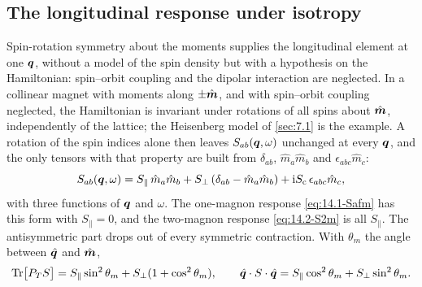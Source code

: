 \subsection{The longitudinal response under isotropy}\label{sec:14.4-iso}

Spin-rotation symmetry about the moments supplies the longitudinal element at one $\bm{q}$, without a model of the spin density but with a hypothesis on the Hamiltonian: spin--orbit coupling and the dipolar interaction are neglected. In a collinear magnet with moments along $\pm\hat{\bm{m}}$, and with spin--orbit coupling neglected, the Hamiltonian is invariant under rotations of all spins about $\hat{\bm{m}}$, independently of the lattice; the Heisenberg model of \cref{sec:7.1} is the example. A rotation of the spin indices alone then leaves $S_{ab}(\bm{q},\omega)$ unchanged at every $\bm{q}$, and the only tensors with that property are built from $\delta_{ab}$, $\hat m_a\hat m_b$ and $\epsilon_{abc}\hat m_c$:
\begin{equation*}
  S_{ab}(\bm{q},\omega) = S_\parallel\,\hat m_a\hat m_b + S_\perp\,(\delta_{ab} - \hat m_a\hat m_b) + \mathrm{i} S_{\mathrm{c}}\,\epsilon_{abc}\hat m_c ,
\end{equation*}
with three functions of $\bm{q}$ and $\omega$. The one-magnon response \cref{eq:14.1-Safm} has this form with $S_\parallel = 0$, and the two-magnon response \cref{eq:14.2-S2m} is all $S_\parallel$. The antisymmetric part drops out of every symmetric contraction. With $\theta_m$ the angle between $\hat{\bm{q}}$ and $\hat{\bm{m}}$,
\begin{equation}
  \operatorname{Tr}\bigl[P_TS\bigr] = S_\parallel\sin^2\theta_m + S_\perp(1 + \cos^2\theta_m), \qquad
  \hat{\bm{q}}\cdot S\cdot\hat{\bm{q}} = S_\parallel\cos^2\theta_m + S_\perp\sin^2\theta_m .
  \label{eq:14.4-uniax}
\end{equation}
